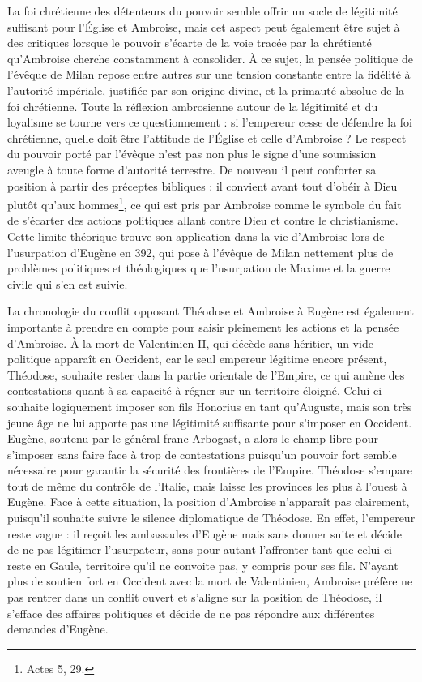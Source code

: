 La foi chrétienne des détenteurs du pouvoir semble offrir un socle de légitimité suffisant pour l'Église et Ambroise, mais cet aspect peut également être sujet à des critiques lorsque le pouvoir s'écarte de la voie tracée par la chrétienté qu'Ambroise cherche constamment à consolider. À ce sujet, la pensée politique de l'évêque de Milan repose entre autres sur une tension constante entre la fidélité à l'autorité impériale, justifiée par son origine divine, et la primauté absolue de la foi chrétienne. Toute la réflexion ambrosienne autour de la légitimité et du loyalisme se tourne vers ce questionnement : si l'empereur cesse de défendre la foi chrétienne, quelle doit être l'attitude de l'Église et celle d'Ambroise ? Le respect du pouvoir porté par l'évêque n'est pas non plus le signe d'une soumission aveugle à toute forme d'autorité terrestre. De nouveau il peut conforter sa position à partir des préceptes bibliques : il convient avant tout d'obéir à Dieu plutôt qu'aux hommes\footnote{Actes 5, 29.}, ce qui est pris par Ambroise comme le symbole du fait de s'écarter des actions politiques allant contre Dieu et contre le christianisme. Cette limite théorique trouve son application dans la vie d'Ambroise lors de l'usurpation d'Eugène en 392, qui pose à l'évêque de Milan nettement plus de problèmes politiques et théologiques que l'usurpation de Maxime et la guerre civile qui s'en est suivie.

\bigskip

La chronologie du conflit opposant Théodose et Ambroise à Eugène est également importante à prendre en compte pour saisir pleinement les actions et la pensée d’Ambroise. À la mort de Valentinien II, qui décède sans héritier, un vide politique apparaît en Occident, car le seul empereur légitime encore présent, Théodose, souhaite rester dans la partie orientale de l'Empire, ce qui amène des contestations quant à sa capacité à régner sur un territoire éloigné\autocite[343]{mclynn_ambrose}. Celui-ci souhaite logiquement imposer son fils Honorius en tant qu'Auguste, mais son très jeune âge ne lui apporte pas une légitimité suffisante pour s'imposer en Occident. Eugène, soutenu par le général franc Arbogast, a alors le champ libre pour s'imposer sans faire face à trop de contestations puisqu'un pouvoir fort semble nécessaire pour garantir la sécurité des frontières de l'Empire. Théodose s'empare tout de même du contrôle de l'Italie, mais laisse les provinces les plus à l'ouest à Eugène. Face à cette situation, la position d'Ambroise n'apparaît pas clairement, puisqu'il souhaite suivre le silence diplomatique de Théodose. En effet, l'empereur reste vague : il reçoit les ambassades d’Eugène mais sans donner suite et décide de ne pas légitimer l’usurpateur, sans pour autant l’affronter tant que celui-ci reste en Gaule, territoire qu’il ne convoite pas, y compris pour ses fils\autocite[266-270]{maraval_theodose_2009}. N'ayant plus de soutien fort en Occident avec la mort de Valentinien, Ambroise préfère ne pas rentrer dans un conflit ouvert et s’aligne sur la position de Théodose, il s’efface des affaires politiques et décide de ne pas répondre aux différentes demandes d’Eugène.

